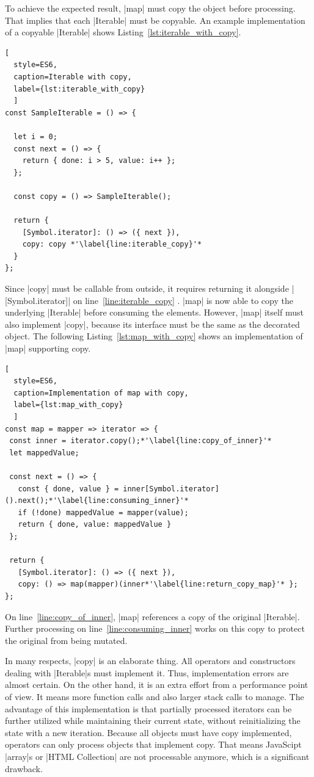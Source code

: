 To achieve the expected result, |map| must copy the object before processing.
That implies that each |Iterable| must be copyable. An example implementation
of a copyable |Iterable| shows Listing~\ref{lst:iterable_with_copy}.

\begin{lstlisting}[
  style=ES6, 
  caption=Iterable with copy,
  label={lst:iterable_with_copy}
  ]
const SampleIterable = () => {

  let i = 0;
  const next = () => {
    return { done: i > 5, value: i++ };
  };

  const copy = () => SampleIterable();

  return {
    [Symbol.iterator]: () => ({ next }),
    copy: copy *'\label{line:iterable_copy}'*
  }
};
\end{lstlisting}
Since |copy| must be callable from outside, it requires returning it alongside 
|[Symbol.iterator]| on line~\ref{line:iterable_copy} . |map| is now
able to copy the underlying  |Iterable| before consuming the elements.
However, |map| itself must also implement |copy|, because its interface must be
the same as the decorated object. The following Listing~\ref{lst:map_with_copy} 
shows an implementation of |map| supporting copy.

\begin{lstlisting}[
  style=ES6, 
  caption=Implementation of map with copy,
  label={lst:map_with_copy}
  ]
const map = mapper => iterator => {
 const inner = iterator.copy();*'\label{line:copy_of_inner}'*
 let mappedValue;

 const next = () => {
   const { done, value } = inner[Symbol.iterator]().next();*'\label{line:consuming_inner}'*
   if (!done) mappedValue = mapper(value);
   return { done, value: mappedValue }
 };

 return {
   [Symbol.iterator]: () => ({ next }),
   copy: () => map(mapper)(inner*'\label{line:return_copy_map}'* };
};
\end{lstlisting}
On line~\ref{line:copy_of_inner}, |map| references a copy of the original
|Iterable|. Further processing on line~\ref{line:consuming_inner} works on this 
copy to protect the original from being mutated.

In many respects, |copy| is an elaborate thing. All operators and constructors 
dealing with |Iterable|s must implement it. Thus, implementation errors are 
almost certain. On the other hand, it is an extra effort from a performance point 
of view. It means more function calls and also larger stack calls to manage.
The advantage of this implementation is that partially processed iterators can
be further utilized while maintaining their current state, without
reinitializing the state with a new iteration.
Because all objects must have copy implemented, operators can 
only process objects that implement copy. That means JavaScipt |array|s or 
|HTML Collection| are not processable anymore, which is a significant drawback.

